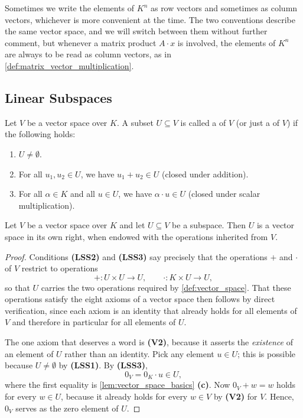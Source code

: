 \begin{importantremark}
\label{rem:row_or_column}
Sometimes we write the elements of $K^n$ as row vectors and sometimes as column vectors, whichever is more convenient at the time. The two conventions describe the same vector space, and we will switch between them without further comment, but whenever a matrix product $A \cdot x$ is involved, the elements of $K^n$ are always to be read as column vectors, as in \cref{def:matrix_vector_multiplication}.
\end{importantremark}

\subsection{Linear Subspaces}

\begin{definition}
\label{def:linear_subspace}
Let $V$ be a vector space over $K$. A subset $U \subseteq V$ is called a  of $V$ (or just a  of $V$) if the following holds:
\begin{enumerate}[label=(\textbf{LSS}\arabic*), leftmargin=4.5em]
    \item $U \ne \emptyset$.
    \item For all $u_1, u_2 \in U$, we have $u_1 + u_2 \in U$ (closed under addition).
    \item For all $\alpha \in K$ and all $u \in U$, we have $\alpha \cdot u \in U$ (closed under scalar multiplication).
\end{enumerate}
\end{definition}

\begin{lemma}
\label{lem:subspace_is_vector_space}
Let $V$ be a vector space over $K$ and let $U \subseteq V$ be a subspace. Then $U$ is a vector space in its own right, when endowed with the operations inherited from $V$.
\end{lemma}

\begin{proof}
Conditions \textbf{(LSS2)} and \textbf{(LSS3)} say precisely that the operations $+$ and $\cdot$ of $V$ restrict to operations
\[
+ \colon U \times U \longrightarrow U, \qquad \cdot \colon K \times U \longrightarrow U,
\]
so that $U$ carries the two operations required by \cref{def:vector_space}. That these operations satisfy the eight axioms of a vector space then follows by direct verification, since each axiom is an identity that already holds for all elements of $V$ and therefore in particular for all elements of $U$.

The one axiom that deserves a word is \textbf{(V2)}, because it asserts the \emph{existence} of an element of $U$ rather than an identity. Pick any element $u \in U$; this is possible because $U \ne \emptyset$ by \textbf{(LSS1)}. By \textbf{(LSS3)},
\[
0_V = 0_K \cdot u \in U,
\]
where the first equality is \cref{lem:vector_space_basics} \textbf{(c)}. Now $0_V + w = w$ holds for every $w \in U$, because it already holds for every $w \in V$ by \textbf{(V2)} for $V$. Hence, $0_V$ serves as the zero element of $U$.
\end{proof}

